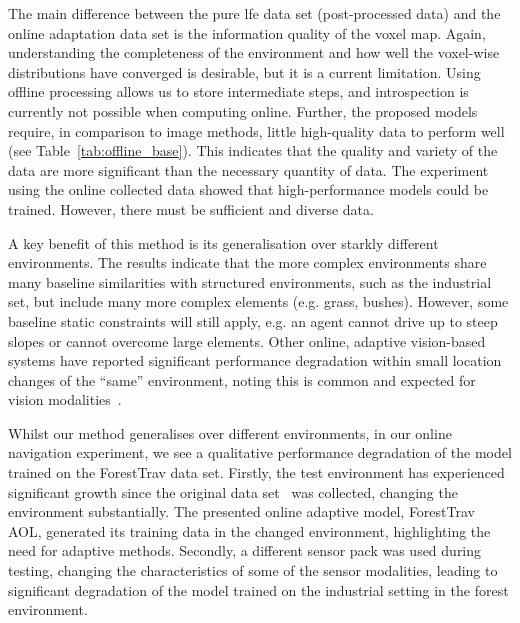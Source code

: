 The main difference between the pure \ac{lfe} data set (post-processed data) and the online adaptation data set is the information quality of the voxel map. Again, understanding the completeness of the environment and how well the voxel-wise distributions have converged is desirable, but it is a current limitation. Using offline processing allows us to store intermediate steps, and introspection is currently not possible when computing online. Further, the proposed models require, in comparison to image methods, little high-quality data to perform well (see Table~\ref{tab:offline_base}). This indicates that the quality and variety of the data are more significant than the necessary quantity of data. The experiment using the online collected data showed that high-performance models could be trained. However, there must be sufficient and diverse data. 


A key benefit of this method is its generalisation over starkly different environments. The results indicate that the more complex environments share many baseline similarities with structured environments, such as the industrial set, but include many more complex elements (e.g. grass, bushes). However, some baseline static constraints will still apply, e.g. an agent cannot drive up to steep slopes or cannot overcome large elements. Other online, adaptive vision-based systems have reported significant performance degradation within small location changes of the ``same'' environment, noting this is common and expected for vision modalities~\cite{frey2023fast}.  

Whilst our method generalises over different environments, in our online navigation experiment, we see a qualitative performance degradation of the model trained on the ForestTrav data set. Firstly, the test environment has experienced significant growth since the original data set~\cite{ruetz2024foresttrav} was collected, changing the environment substantially. The presented online adaptive model, ForestTrav AOL, generated its training data in the changed environment, highlighting the need for adaptive methods. Secondly, a different sensor pack was used during testing, changing the characteristics of some of the sensor modalities, leading to significant degradation of the model trained on the industrial setting in the forest environment.  



